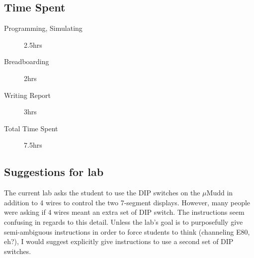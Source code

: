 \documentclass[11pt]{article}
\begin{document}
\subsection{Time Spent}

\begin{description}
	\item[Programming, Simulating] 2.5hrs
	\item[Breadboarding] 2hrs
	\item[Writing Report] 3hrs
	\item[Total Time Spent] 7.5hrs
\end{description}

\subsection{Suggestions for lab}

The current lab asks the student to use the DIP switches on the $\mu$Mudd in addition to 4 wires to control the two 7-segment displays. However, many people were asking if 4 wires meant an extra set of DIP switch. The instructions seem confusing in regards to this detail. Unless the lab's goal is to purposefully give semi-ambiguous instructions in order to force students to think (channeling E80, eh?), I would suggest explicitly give instructions to use a second set of DIP switches.
\end{document}
